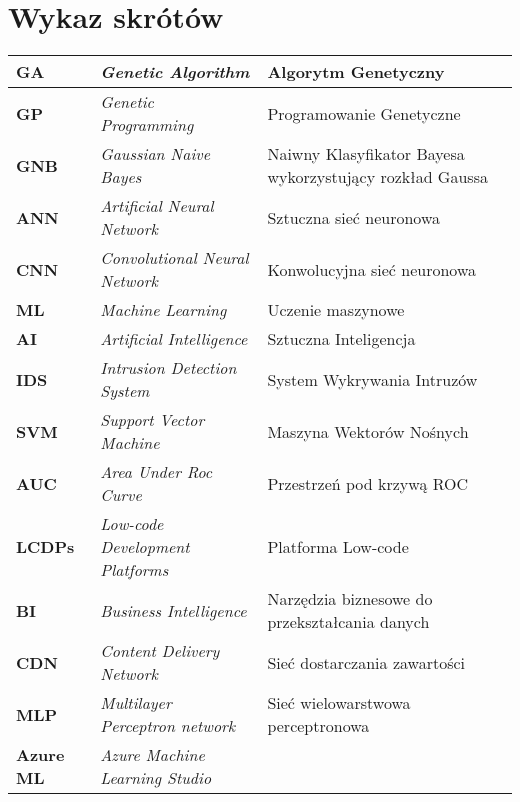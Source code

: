 \section*{Wykaz skrótów}

\begin{table}[H]
    \centering
    \begin{tabularx}{\linewidth}{lXX}
        \textbf{GA} & \textit{Genetic Algorithm} & Algorytm Genetyczny \\ \hline
        \textbf{GP} & \textit{Genetic Programming} & Programowanie Genetyczne \\ \hline
        \textbf{GNB} & \textit{Gaussian Naive Bayes} & Naiwny Klasyfikator Bayesa wykorzystujący rozkład Gaussa \\ \hline
        \textbf{ANN} & \textit{Artificial Neural Network} & Sztuczna sieć neuronowa \\ \hline
        \textbf{CNN} & \textit{Convolutional Neural Network} & Konwolucyjna sieć neuronowa \\ \hline
        \textbf{ML} & \textit{Machine Learning} & Uczenie maszynowe \\ \hline
        \textbf{AI} & \textit{Artificial Intelligence} & Sztuczna Inteligencja \\ \hline
        \textbf{IDS} & \textit{Intrusion Detection System} & System Wykrywania Intruzów \\ \hline
        \textbf{SVM} & \textit{Support Vector Machine} & Maszyna Wektorów Nośnych \\ \hline
        \textbf{AUC} & \textit{Area Under Roc Curve} & Przestrzeń pod krzywą ROC \\ \hline
        \textbf{LCDPs} & \textit{Low-code Development Platforms} & Platforma Low-code \\ \hline
        \textbf{BI} & \textit{Business Intelligence} & Narzędzia biznesowe do przekształcania danych \\ \hline
        \textbf{CDN} & \textit{Content Delivery Network} & Sieć dostarczania zawartości \\ \hline
        \textbf{MLP} & \textit{Multilayer Perceptron network} & Sieć wielowarstwowa perceptronowa \\ \hline
        \textbf{Azure ML} & \textit{Azure Machine Learning Studio} & \\
    \end{tabularx}
    \label{tab:shorts}
\end{table}